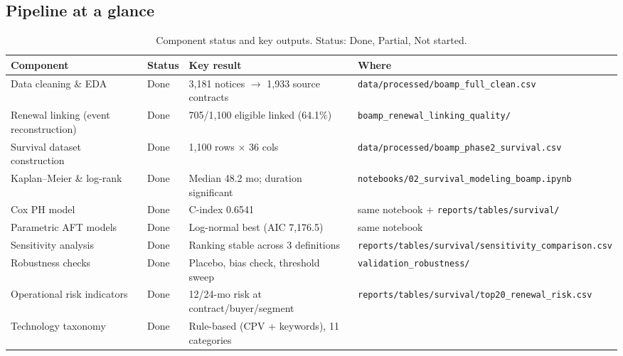 \documentclass[11pt,a4paper]{article}
\begin{document}
\subsection*{Pipeline at a glance}

\begin{landscape}
\begin{table}[p]
\centering
\caption{Component status and key outputs. Status: \textcolor{done}{Done},
\textcolor{partial}{Partial}, \textcolor{notdone}{Not started}.}
\label{tab:pipeline}
\scriptsize
\begin{tabular}{@{}p{4.2cm}p{1.6cm}p{5.4cm}p{10.0cm}@{}}
\toprule
\textbf{Component} & \textbf{Status} & \textbf{Key result} & \textbf{Where} \\
\midrule
Data cleaning \& EDA
  & \textcolor{done}{Done}
  & 3,181 notices $\to$ 1,933 source contracts
  & \nolinkurl{data/processed/boamp_full_clean.csv} \\[3pt]
Renewal linking (event reconstruction)
  & \textcolor{done}{Done}
  & 705/1,100 eligible linked (64.1\%)
  & \nolinkurl{boamp_renewal_linking_quality/} \\[3pt]
Survival dataset construction
  & \textcolor{done}{Done}
  & 1,100 rows $\times$ 36 cols
  & \nolinkurl{data/processed/boamp_phase2_survival.csv} \\[3pt]
Kaplan--Meier \& log-rank
  & \textcolor{done}{Done}
  & Median 48.2 mo; duration significant
  & \nolinkurl{notebooks/02_survival_modeling_boamp.ipynb} \\[3pt]
Cox PH model
  & \textcolor{done}{Done}
  & C-index 0.6541
  & same notebook + \nolinkurl{reports/tables/survival/} \\[3pt]
Parametric AFT models
  & \textcolor{done}{Done}
  & Log-normal best (AIC 7,176.5)
  & same notebook \\[3pt]
Sensitivity analysis
  & \textcolor{done}{Done}
  & Ranking stable across 3 definitions
  & \nolinkurl{reports/tables/survival/sensitivity_comparison.csv} \\[3pt]
Robustness checks
  & \textcolor{done}{Done}
  & Placebo, bias check, threshold sweep
  & \nolinkurl{validation_robustness/} \\[3pt]
Operational risk indicators
  & \textcolor{done}{Done}
  & 12/24-mo risk at contract/buyer/segment
  & \nolinkurl{reports/tables/survival/top20_renewal_risk.csv} \\[3pt]
Technology taxonomy
  & \textcolor{done}{Done}
  & Rule-based (CPV + keywords), 11 categories

\end{tabular}
\end{table}
\end{landscape}
\end{document}
